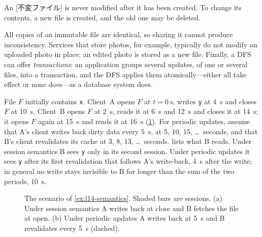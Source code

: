 \documentclass[../main.tex]{subfiles}
\begin{document}
\begin{definition}
  An [不変ファイル] is never modified after it has
  been created.  To change its contents, a new file is created, and the old
  one may be deleted.
\end{definition}

All copies of an immutable file are identical, so sharing it cannot
produce inconsistency.  Services that store photos, for example, typically
do not modify an uploaded photo in place; an edited photo is stored as a
new file.  Finally,
a DFS can offer \emph{transactions}: an application groups several updates, of one or several files, into a transaction, and
the DFS applies them atomically---either all take effect or none
does---as a database system does.

\begin{example}
  \label{ex:l14-semantics}
  File $F$ initially contains \texttt{x}.  Client~A opens $F$ at
  $t=\SI{0}{\second}$, writes \texttt{y} at \SI{4}{\second} and closes $F$
  at \SI{10}{\second}.  Client~B opens $F$ at \SI{2}{\second}, reads it at
  \SI{6}{\second} and \SI{12}{\second} and closes it at \SI{14}{\second};
  it opens $F$ again at \SI{15}{\second} and reads it at \SI{16}{\second}
  (\cref{fig:l14-semantics}).  For periodic updates, assume that A's client
  writes back dirty data every \SI{5}{\second}, at 5, 10, 15,
  \ldots~seconds, and that B's client revalidates its cache at 3, 8, 13,
  \ldots~seconds.   lists what B reads.  Under
  session semantics B sees \texttt{y} only in its second session.  Under
  periodic updates it sees \texttt{y} after its first revalidation that
  follows A's write-back, \SI{4}{\second} after the write; in general no
  write stays invisible to B for longer than the sum of the two periods,
  \SI{10}{\second}.
\end{example}

\begin{figure}[htbp]
  \centering
  
  \caption{The scenario of \cref{ex:l14-semantics}.  Shaded bars are
    sessions.  (a) Under session semantics A writes back at close and B
    fetches the file at open.  (b) Under periodic updates A writes back at
    \SI{5}{\second} and B revalidates every \SI{5}{\second} (dashed).}
  \label{fig:l14-semantics}
\end{figure}
\end{document}
